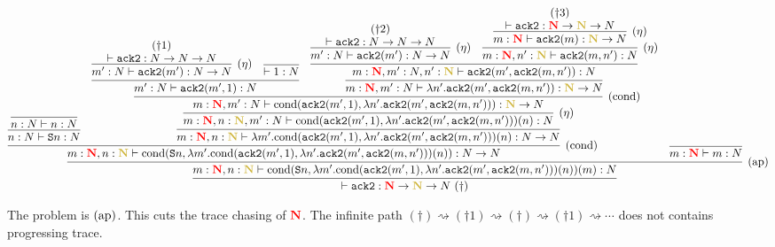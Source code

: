 \documentclass{article}
\newcommand{\bfColor}[2]{{\bf \color{#1}{#2}}}
\newcommand{\Reta}{\hbox{$(\eta)$}}
\newcommand{\Rap}{\hbox{$(\text{ap})$}}
\newcommand{\Rcond}{\hbox{$(\text{cond})$}}
\newcommand{\AckB}{{\tt ack2}}
\newcommand{\Cond}[2]{\text{cond}(#1,#2)}
\newcommand{\Suc}[1]{{\tt S}#1}
\newcommand{\N}{N}
\newcommand{\gN}{\bfColor{oldgold}{N}}
\newcommand{\rN}{\bfColor{red}{N}}
\begin{document}
{\scriptsize
  \hspace{-3cm}
  $\infer{
    \vdash \AckB:\rN\to\gN\to\N\ (\dagger)
  }{
    \infer[\Rap]{
      m:\rN, n:\gN \vdash \Cond{\Suc{n}}{\lambda m'.\Cond{\AckB(m',1)}{\lambda n'.\AckB(m',\AckB(m,n'))}(n)}(m): \N
    }{
      \infer[\Rcond]{
        m:\rN, n:\gN \vdash \Cond{\Suc{n}}{\lambda m'.\Cond{\AckB(m',1)}{\lambda n'.\AckB(m',\AckB(m,n'))}(n)}: \N\to\N
      }{
        \infer{
          n:\N \vdash \Suc{n}: \N
        }{
          \infer{
            n:\N \vdash n: \N
          }{}
        }
        &
        \infer{
          m:\rN, n:\gN \vdash \lambda m'.\Cond{\AckB(m',1)}{\lambda n'.\AckB(m',\AckB(m,n'))}(n): \N\to\N
        }{
          \infer[\Reta]{
            m:\rN, n:\gN, m':\N \vdash \Cond{\AckB(m',1)}{\lambda n'.\AckB(m',\AckB(m,n'))}(n): \N
          }{
            \infer[\Rcond]{
              m:\rN, m':\N \vdash \Cond{\AckB(m',1)}{\lambda n'.\AckB(m',\AckB(m,n'))}: \gN\to\N
            }{
              \infer{
                m':\N \vdash \AckB(m',1): \N
              }{
                \infer[\Reta]{
                  m':\N \vdash \AckB(m'): \N\to\N
                }{
                  \deduce{
                    \vdash \AckB: \N\to\N\to\N
                  }{(\dagger1)}
                }
                &
                \infer{
                  \vdash 1:\N
                }{}
              }
              &
              \infer{
                m:\rN, m':\N \vdash \lambda n'.\AckB(m',\AckB(m,n')): \gN\to\N
              }{
                \infer{
                  m:\rN, m':\N, n':\gN \vdash \AckB(m',\AckB(m,n')): \N
                }{
                  \infer[\Reta]{
                    m':\N \vdash \AckB(m'): \N\to\N
                  }{
                    \deduce{
                      \vdash \AckB: \N\to\N\to\N
                    }{(\dagger2)}
                  }
                  &
                  \infer[\Reta]{
                    m:\rN, n':\gN \vdash \AckB(m,n'): \N
                  }{
                    \infer[\Reta]{
                      m:\rN \vdash \AckB(m): \gN\to\N
                    }{
                      \deduce{
                        \vdash \AckB: \rN\to\gN\to\N
                      }{(\dagger3)}
                    }
                  }
                }
              }
            }
          }
        }
      }
      &
      \infer{
        m:\rN \vdash m:\N
      }{}
    }
  }$
}

The problem is $\Rap$.
This cuts the trace chasing of $\rN$. 
The infinite path $(\dagger)\rightsquigarrow(\dagger1)\rightsquigarrow(\dagger)\rightsquigarrow(\dagger1)\rightsquigarrow\cdots$ does not contains progressing trace. 
\end{document}
